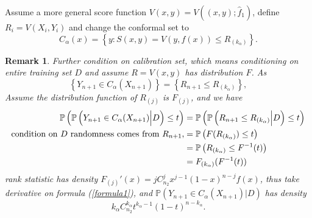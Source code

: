 \documentclass[12pt, a4paper, oneside]{article}
\newtheorem{remark}[theorem]{Remark}
\begin{document}
    Assume a more general score function $V(x,y)=V((x,y);\hat{f}_1)$, define $R_i=V(X_i,Y_i)$ and change the conformal set to
    \begin{equation*}
        C_\alpha(x)=\left\{ y:S(x,y)=V(y,f(x))\leq R_{(k_\alpha)} \right\}.
    \end{equation*}


    \begin{remark}
        Further condition on calibration set, which means conditioning on entire training set $D$ and assume $R=V(x,y)$ has distribution $F$. As
        \begin{equation*}
            \left\{ Y_{n+1}\in C_\alpha(X_{n+1}) \right\}=\left\{ R_{n+1}\leq R_{(k_\alpha)} \right\},
        \end{equation*}
        Assume the distribution function of $R_{(j)}$ is $F_{(j)}$, and we have
        \begin{align}
            \mathbb{P}\left( \mathbb{P}\left( Y_{n+1}\in C_\alpha(X_{n+1})\Big|D \right)\leq t \right)&=\mathbb{P}\left( \mathbb{P}\left( R_{n+1}\leq R_{(k_\alpha)}\Big|D \right)\leq t \right)\notag\\
            \text{condition on $D$ randomness comes from $R_{n+1}$,}&=\mathbb{P}\left( F(R_{(k_\alpha)})\leq t \right)\notag\\
            &=\mathbb{P}\left( R_{(k_\alpha)}\leq F^{-1}(t) \right)\notag\\
            &=F_{(k_\alpha)}(F^{-1}(t))\label{formula1}
        \end{align}
        rank statistic has density $F_{(j)}'(x)=jC_{n_2}^jx^{j-1}(1-x)^{n-j}f(x)$, thus take derivative on formula (\ref{formula1}), and $\mathbb{P}\left( Y_{n+1}\in C_\alpha(X_{n+1})\Big|D \right)$ has density
        \begin{equation*}
            k_\alpha C_{n_2}^{k_\alpha}t^{k_\alpha-1}(1-t)^{n-k_\alpha}.
        \end{equation*}
    \end{remark}
\end{document}
